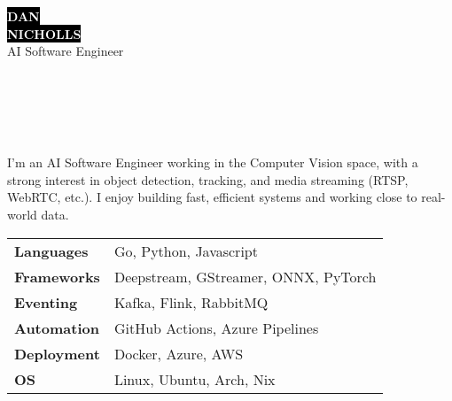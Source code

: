 \documentclass[9pt]{extarticle}
\begin{document}

\begin{minipage}[t]{0.40\textwidth}
	\vspace{-\baselineskip}
	\colorbox{black}{{\HUGE\textcolor{white}{\textbf{\MakeUppercase{Dan}}}}}\\[2pt]
	\colorbox{black}{{\HUGE\textcolor{white}{\textbf{\MakeUppercase{Nicholls}}}}}\\[6pt]
	\vspace{6pt}
	{\LARGE AI Software Engineer}
\end{minipage}
\hfill
\begin{minipage}[t]{0.50\textwidth}
	\vspace{-\baselineskip}
		\\
		\\
		\\
		\\
\end{minipage}

\vspace{0.5cm}


\begin{minipage}[t]{0.45\textwidth}
	\vspace{-\baselineskip}


	I'm an AI Software Engineer working in the Computer Vision space, with a strong interest in object detection, tracking, and media streaming (RTSP, WebRTC, etc.). I enjoy building fast, efficient systems and working close to real-world data.

\end{minipage}
\hfill 
\begin{minipage}[t]{0.5\textwidth}
	\vspace{-\baselineskip}


	\begin{tabular}{@{}p{8em} l@{}}
	\textbf{Languages}   & Go, Python, Javascript \\
	\textbf{Frameworks}  & Deepstream, GStreamer, ONNX, PyTorch \\
	\textbf{Eventing}	 & Kafka, Flink, RabbitMQ \\
	\textbf{Automation}  & GitHub Actions, Azure Pipelines \\
	\textbf{Deployment}  & Docker, Azure, AWS \\
	\textbf{OS}          & Linux, Ubuntu, Arch, Nix \\
	\end{tabular}
\end{minipage}
\end{document}
